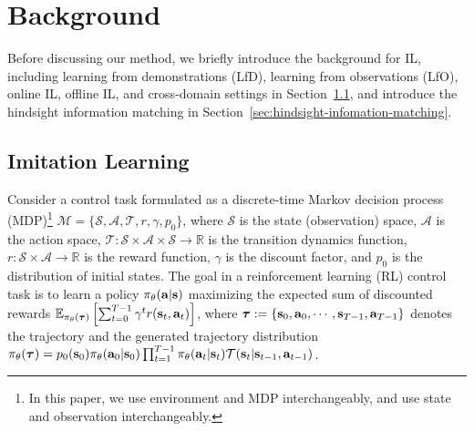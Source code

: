 
\section{Background}

Before discussing our method, we briefly introduce the background for IL, including learning from demonstrations (LfD), learning from observations (LfO), online IL, offline IL, and cross-domain settings in Section~\ref{sec:imitation-learning}, and introduce the hindsight information matching in Section~\ref{sec:hindsight-infomation-matching}. 

\subsection{Imitation Learning}
\label{sec:imitation-learning}

Consider a control task formulated as a discrete-time Markov decision process (MDP)\footnote{In this paper, we use environment and MDP interchangeably, and use state and observation interchangeably.} 
$\mathcal{M} = \{ \mathcal{S}, \mathcal{A}, \mathcal{T}, r, \gamma, p_0 \}$, where $\mathcal{S}$ is the state (observation) space, $\mathcal{A}$ is the action space, $\mathcal{T}: \mathcal{S} \times \mathcal{A} \times \mathcal{S} \to \mathbb{R}$ is the transition dynamics function, $r: \mathcal{S} \times \mathcal{A} \to \mathbb{R}$ is the reward function, $\gamma$ is the discount factor, and $p_0$ is the distribution of initial states. The goal in a reinforcement learning (RL) control task is to learn a policy $\pi_\theta(\mathbf{a}|\mathbf{s})$ maximizing the expected sum of discounted rewards  $\mathbb{E}_{\pi_\theta({\bm{\tau}})}\left[ \sum_{t=0}^{T-1} \gamma^t r(\mathbf{s}_t, \mathbf{a}_t) \right]$, where ${\bm{\tau}} := \{\mathbf{s}_0, \mathbf{a}_0, \cdots, \mathbf{s}_{T-1}, \mathbf{a}_{T-1}\}$ denotes the trajectory and the generated trajectory distribution $\pi_\theta({\bm{\tau}}) = p_0(\mathbf{s}_0)\pi_\theta(\mathbf{a}_0|\mathbf{s}_0)\prod_{t=1}^{T-1}\pi_\theta(\mathbf{a}_t|\mathbf{s}_t)\mathcal{T}(\mathbf{s}_t|\mathbf{s}_{t-1}, \mathbf{a}_{t-1})$.

